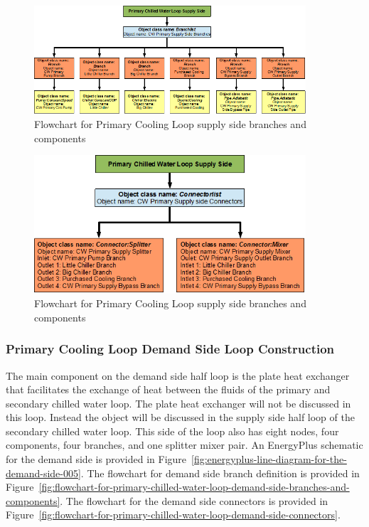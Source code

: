 \begin{figure}[hbtp] %
\centering
\includegraphics[width=0.9\textwidth, height=0.9\textheight, keepaspectratio=true]{media/image094.png}
\caption{Flowchart for Primary Cooling Loop supply side branches and components \protect \label{fig:flowchart-for-primary-cooling-loop-supply-side-branches-and-components}}
\end{figure}

\begin{figure}[hbtp] %
\centering
\includegraphics[width=0.9\textwidth, height=0.9\textheight, keepaspectratio=true]{media/image095.png}
\caption{Flowchart for Primary Cooling Loop supply side branches and components \protect \label{fig:flowchart-for-primary-cooling-loop-supply-side-connectors}}
\end{figure}

\subsubsection{Primary Cooling Loop Demand Side Loop Construction}\label{primary-cooling-loop-demand-side-loop-construction}

The main component on the demand side half loop is the plate heat exchanger that facilitates the exchange of heat between the fluids of the primary and secondary chilled water loop. The plate heat exchanger will not be discussed in this loop. Instead the object will be discussed in the supply side half loop of the secondary chilled water loop. This side of the loop also has eight nodes, four components, four branches, and one splitter mixer pair. An EnergyPlus schematic for the demand side is provided in Figure~\ref{fig:energyplus-line-diagram-for-the-demand-side-005}. The flowchart for demand side branch definition is provided in Figure~\ref{fig:flowchart-for-primary-chilled-water-loop-demand-side-branches-and-components}. The flowchart for the demand side connectors is provided in Figure~\ref{fig:flowchart-for-primary-chilled-water-loop-demand-side-connectors}.

